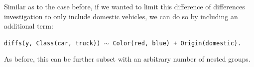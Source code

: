 Similar as to the case before, if we wanted to limit this difference of differences investigation to only include domestic vehicles, we can do so by including an additional term:

\begin{center}
\tt diffs(y, Class(car, truck)) $\sim$ Color(red, blue) + Origin(domestic).
\end{center}

As before, this can be further subset with an arbitrary number of nested groups.

%
%
%
%
%
%
%
%
%

